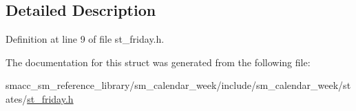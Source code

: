 \subsection{Detailed Description}


Definition at line 9 of file st\+\_\+friday.\+h.



The documentation for this struct was generated from the following file\+:\begin{DoxyCompactItemize}
\item 
smacc\+\_\+sm\+\_\+reference\+\_\+library/sm\+\_\+calendar\+\_\+week/include/sm\+\_\+calendar\+\_\+week/states/\hyperlink{st__friday_8h}{st\+\_\+friday.\+h}\end{DoxyCompactItemize}
